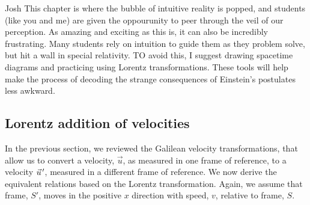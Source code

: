 \begin{studentOpinion}{Josh}{}
	This chapter is where the bubble of intuitive reality is popped, and students (like you and me) are given the oppourunity to peer through the veil of our perception. As amazing and exciting as this is, it can also be incredibly frustrating. Many students rely on intuition to guide them as they problem solve, but hit a wall in special relativity. TO avoid this, I suggest drawing spacetime diagrams and practicing using Lorentz transformations. These tools will help make the process of decoding the strange consequences of Einstein's postulates less awkward.
\end{studentOpinion}

\subsection{Lorentz addition of velocities}
In the previous section, we reviewed the Galilean velocity transformations, that allow us to convert a velocity, $\vec u$, as measured in one frame of reference, to a velocity $\pvec u'$, measured in a different frame of reference. We now derive the equivalent relations based on the Lorentz transformation. Again, we assume that frame, $S'$, moves in the positive $x$ direction with speed, $v$, relative to frame, $S$. 

